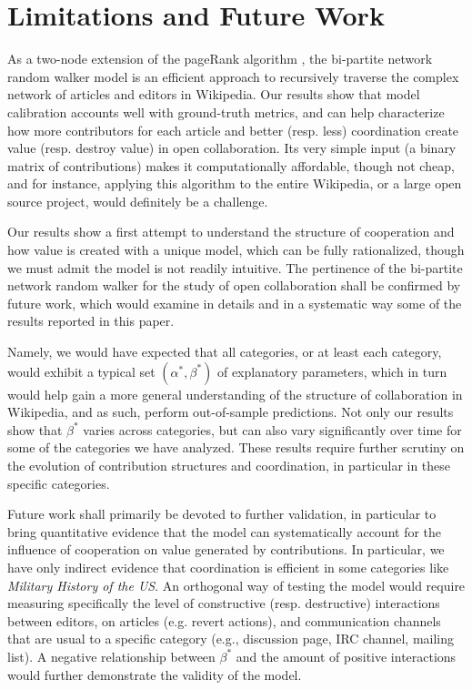 \section{Limitations and Future Work}
As a two-node extension of the pageRank algorithm \cite{}, the {bi-partite network random walker} model is an efficient approach to recursively traverse the complex network of articles and editors in Wikipedia. Our results show that model calibration accounts well with ground-truth metrics, and can help characterize how more contributors for each article and better (resp. less) coordination create value (resp. destroy value) in open collaboration. Its very simple input (a binary matrix of contributions) makes it computationally affordable, though not cheap, and for instance, applying this algorithm to the entire Wikipedia, or a large open source project, would definitely be a challenge.

Our results show a first attempt to understand the structure of cooperation and how value is created with a unique model, which can be fully rationalized, though we must admit the model is not readily intuitive. The pertinence of the {bi-partite network random walker} for the study of open collaboration shall be confirmed by future work, which would examine in details and in a systematic way some of the results reported in this paper.

Namely, we would have expected that all categories, or at least each category, would exhibit a typical set $(\alpha^{*},\beta^{*})$ of explanatory parameters, which in turn would help gain a more general understanding of the structure of collaboration in Wikipedia, and as such, perform out-of-sample predictions. Not only our results show that $\beta^{*}$ varies across categories, but can also vary significantly over time for some of the categories we have analyzed. These results require further scrutiny on the evolution of contribution structures and coordination, in particular in these specific categories. 

Future work shall primarily be devoted to further validation, in particular to bring quantitative evidence that the model can systematically account for the influence of cooperation on value generated by contributions. In particular, we have only indirect evidence that coordination is efficient in some categories like {\it Military History of the US}. An orthogonal way of testing the model would require measuring specifically the level of constructive (resp. destructive) interactions between editors, on articles (e.g. revert actions), and communication channels that are usual to a specific category (e.g., discussion page, IRC channel, mailing list). A negative relationship between $\beta^{*}$ and the amount of positive interactions would further demonstrate the validity of the model.

